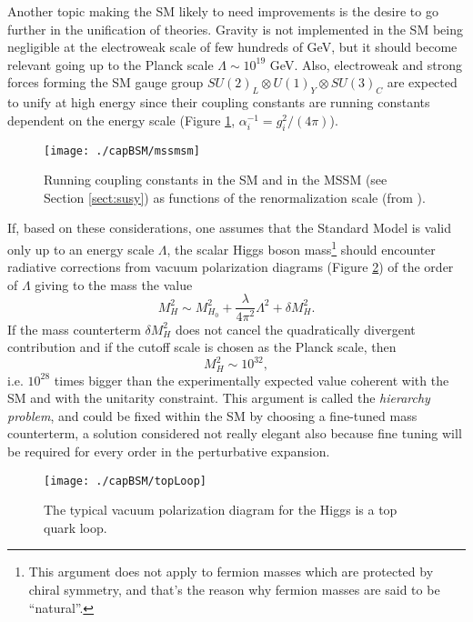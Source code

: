 Another topic making the SM likely to need improvements is the desire to go further in the unification of theories. Gravity is not implemented in the SM being negligible at the electroweak scale of few hundreds of GeV, but it should become relevant going up to the Planck scale $\Lambda \sim 10^{19}$ GeV. Also, electroweak and strong forces forming the SM gauge group $SU(2)_{L}\otimes U(1)_{Y}\otimes SU(3)_{C}$ are expected to unify at high energy since their coupling constants are running constants dependent on the energy scale (Figure \ref{running}, $\alpha^{-1}_{i} = g^{2}_{i}/(4\pi)$). 
\begin{figure}[htb]\begin{center}
\texttt{[image: ./capBSM/mssmsm]}\caption{Running coupling constants in the SM and in the MSSM (see Section \ref{sect:susy}) as functions of the renormalization scale (from \cite{pdg2008}).}
\label{running}\end{center}\end{figure}
If, based on these considerations,  one assumes that the Standard Model is valid only up to  an energy scale $\Lambda$, the scalar Higgs boson mass\footnote{This argument does not apply to fermion masses which are protected by chiral symmetry, and that's the reason why fermion masses are said to be ``natural''.} should encounter radiative corrections from vacuum polarization diagrams (Figure \ref{topLoop}) of the order of $\Lambda$ giving to the mass the value \cite{dawson-1997} \begin{equation}\label{eq:higgsMass}
M_{H}^{2} \sim M_{H_{0}}^{2} + \dfrac{\lambda}{4\pi^{2}} \Lambda^{2} + \delta M_{H}^{2}. \end{equation}
If the mass counterterm $\delta M_{H}^{2}$ does not cancel the quadratically divergent contribution and if the cutoff scale is chosen as the Planck scale, then
\begin{equation}
M_{H}^{2} \sim 10^{32},\end{equation} i.e. $10^{28}$ times bigger than the experimentally expected value coherent with the SM and with the unitarity constraint. This argument is called the \textit{hierarchy problem}, and could be fixed within the SM by choosing a fine-tuned mass counterterm, a solution considered not really elegant also because fine tuning will be required for every order in the perturbative expansion.
\begin{figure}[htb]\begin{center}
\texttt{[image: ./capBSM/topLoop]}\caption{The typical vacuum polarization diagram for the Higgs is a top quark loop.}
\label{topLoop}\end{center}\end{figure}
